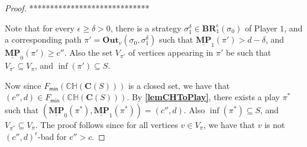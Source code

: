 \begin{proof}
*****************************

Note that for every $\epsilon \ge \delta > 0$, there is a strategy $\sigma_1^\delta \in \mathbf{BR}_1^{\epsilon}(\sigma_0)$ of Player $1$, and a corresponding path $\pi' = \mathbf{Out}_v(\sigma_0, \sigma_1^\delta)$ such that $\underline{\mathbf{MP}}_1(\pi') > d-\delta$, and $\underline{\mathbf{MP}}_0(\pi') \geqslant c''$.
Also the set $V_{\pi'}$ of vertices appearing in $\pi'$ be such that $V_{\pi'} \subseteq V_\pi$, and $\inf(\pi') \subseteq S$.

Now since $F_{\mathsf{min}}(\mathbb{CH}(\mathbf{C}(S)))$ is a closed set, we have that $(c'',d) \in F_{\mathsf{min}}(\mathbb{CH}(\mathbf{C}(S)))$.
By \textbf{\cref{lemCHToPlay}}, there exists a play $\pi^*$ such that $(\underline{\mathbf{MP}}_0(\pi^*), \underline{\mathbf{MP}}_1(\pi^*)) = (c'',d)$.
Also $\inf(\pi^*) \subseteq S$, and $V_{\pi^*} \subseteq V_{\pi}$.
The proof follows since for all vertices $v \in V_\pi$, we have that $v$ is not $(c'',d)^{\epsilon}$-bad for $c'' > c$.
\end{proof}